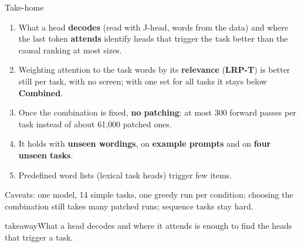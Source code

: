 \documentclass[aspectratio=169,11pt,xcolor=table]{beamer}
\newcommand{\takeaway}[1]{\vfill
  \begin{beamercolorbox}[wd=\textwidth,sep=6pt]{takeaway}\small #1\end{beamercolorbox}}
\newcommand{\Sel}{\textcolor{cSel}{\textbf{Combined}}}
\newcommand{\LRPT}{\textcolor{cLRP}{\textbf{LRP-T}}}
\begin{document}
\begin{frame}{Take-home}
\begin{enumerate}\setlength{\itemsep}{0.7em}
\item What a head \textbf{decodes} (read with J-head, words from the data) and where the last token
      \textbf{attends} identify heads that trigger the task better than the causal ranking at most sizes.
\item Weighting attention to the task words by its \textbf{relevance} (\LRPT) is better still per task,
      with no screen; with one set for all tasks it stays below \Sel.
\item Once the combination is fixed, \textbf{no patching}: at most 300 forward passes per task
      instead of about 61{,}000 patched ones.
\item It holds with \textbf{unseen wordings}, on \textbf{example prompts} and on \textbf{four unseen tasks}.
\item Predefined word lists (lexical task heads) trigger few items.
\end{enumerate}

\vfill
\footnotesize\color{gray} Caveats: one model, 14 simple tasks, one greedy run per condition; choosing the combination
still takes many patched runs; sequence tasks stay hard.
\takeaway{What a head decodes and where it attends is enough to find the heads that trigger a task.}
\end{frame}
\end{document}
